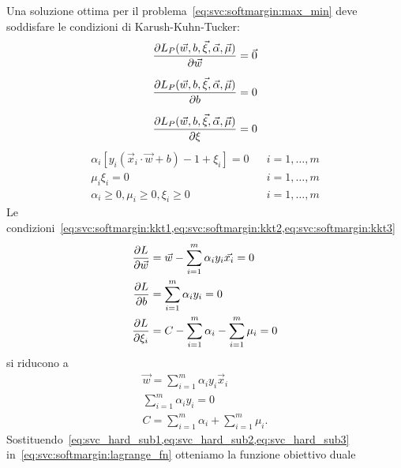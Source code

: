 %
Una soluzione ottima per il problema~\cref{eq:svc:softmargin:max_min} deve soddisfare le condizioni di Karush-Kuhn-Tucker:
\begin{align}
    \label{eq:svc:softmargin:kkt1}
    \frac{\partial{L_P(\Vec{w},b, \Vec{\xi}, \Vec{\alpha}, \Vec{\mu})}}{\partial{\Vec{w}}} = \Vec{0}  \\[2mm]
    \label{eq:svc:softmargin:kkt2}
    \frac{\partial{L_P(\Vec{w},b, \Vec{\xi}, \Vec{\alpha}, \Vec{\mu})}}{\partial{b}} = 0 \\[2mm]
    \label{eq:svc:softmargin:kkt3}
    \frac{\partial{L_P(\Vec{w},b, \Vec{\xi}, \Vec{\alpha}, \Vec{\mu})}}{\partial{\xi}} = 0 
\end{align}
\begin{align}
    \label{eq:svc:softmargin:kkt4}
    \alpha_i[y_i(\Vec{x}_i\cdot\Vec{w}+b)-1+\xi_i] = 0  && i=1,\dots,m \\[2mm] 
    \label{eq:svc:softmargin:kkt5}
    \mu_i\xi_i = 0 && i=1,\dots,m \\[2mm] 
    \label{eq:svc:softmargin:kkt6}
    \alpha_i \geq 0, \mu_i \geq 0, \xi_i \geq 0 && i=1,\dots,m
\end{align}
Le condizioni~\cref{eq:svc:softmargin:kkt1,eq:svc:softmargin:kkt2,eq:svc:softmargin:kkt3}
\begin{equation*}
    \begin{split}
        \frac{\partial{L}}{\partial{\Vec{w}}} & = \Vec{w} - \sum_{i=1}^{m}\alpha_iy_i\Vec{x_i} = 0\\
        \frac{\partial{L}}{\partial{b}} &=  \sum_{i=1}^{m}\alpha_iy_i = 0\\
        \frac{\partial{L}}{\partial{\xi_i}} &= C -\sum_{i=1}^{m}\alpha_i - \sum_{i=1}^{m}\mu_i = 0
    \end{split}
\end{equation*}
si riducono a
\begin{align} 
    \label{eq:svc_hard_sub1}
    \Vec{w} = \sum_{i=1}^{m}\alpha_iy_i\Vec{x}_i  \\[2mm]
    \label{eq:svc_hard_sub2}
    \sum_{i=1}^{m}\alpha_iy_i = 0 \\[2mm]
    \label{eq:svc_hard_sub3}
    C = \sum_{i=1}^{m}\alpha_i + \sum_{i=1}^{m}\mu_i.
\end{align}
Sostituendo~\cref{eq:svc_hard_sub1,eq:svc_hard_sub2,eq:svc_hard_sub3} in~\cref{eq:svc:softmargin:lagrange_fn} otteniamo la funzione obiettivo duale
